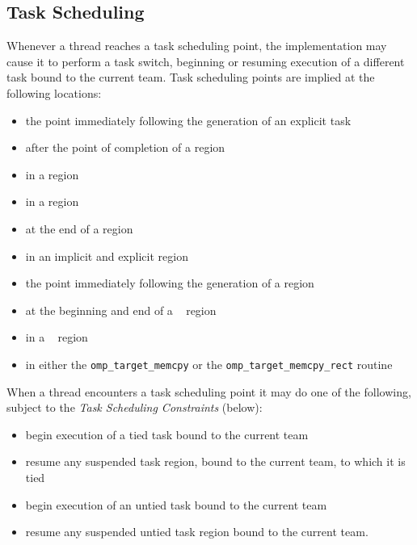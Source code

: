 \subsection{Task Scheduling}
\label{subsec:Task Scheduling}
Whenever a thread reaches a task scheduling point, the implementation may cause it to 
perform a task switch, beginning or resuming execution of a different task bound to the 
current team. Task scheduling points are implied at the following locations:

\begin{itemize}
\item the point immediately following the generation of an explicit task

\item after the point of completion of a  region

\item in a  region

\item in a  region

\item at the end of a  region

\item in an implicit and explicit  region

\item the point immediately following the generation of a  region

\item at the beginning and end of a ~ region

\item in a ~ region 

\item in either the \verb#omp_target_memcpy# or the
  \verb#omp_target_memcpy_rect# routine

\end{itemize}

When a thread encounters a task scheduling point it may do one of the following, 
subject to the \emph{Task Scheduling Constraints} (below):

\begin{itemize}
\item begin execution of a tied task bound to the current team

\item resume any suspended task region, bound to the current team, to which it is tied

\item begin execution of an untied task bound to the current team

\item resume any suspended untied task region bound to the current team.
\end{itemize}

